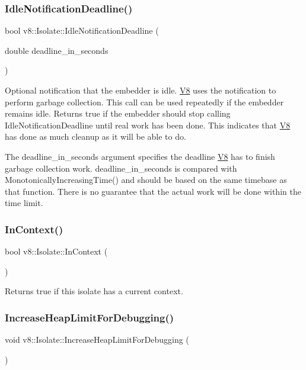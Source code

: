 \subsubsection{\texorpdfstring{Idle\+Notification\+Deadline()}{IdleNotificationDeadline()}}
{\footnotesize\ttfamily bool v8\+::\+Isolate\+::\+Idle\+Notification\+Deadline (\begin{DoxyParamCaption}\item[{double}]{deadline\+\_\+in\+\_\+seconds }\end{DoxyParamCaption})}

Optional notification that the embedder is idle. \mbox{\hyperlink{classv8_1_1V8}{V8}} uses the notification to perform garbage collection. This call can be used repeatedly if the embedder remains idle. Returns true if the embedder should stop calling Idle\+Notification\+Deadline until real work has been done. This indicates that \mbox{\hyperlink{classv8_1_1V8}{V8}} has done as much cleanup as it will be able to do.

The deadline\+\_\+in\+\_\+seconds argument specifies the deadline \mbox{\hyperlink{classv8_1_1V8}{V8}} has to finish garbage collection work. deadline\+\_\+in\+\_\+seconds is compared with Monotonically\+Increasing\+Time() and should be based on the same timebase as that function. There is no guarantee that the actual work will be done within the time limit. \mbox{\label{classv8_1_1Isolate_afb6bbd31a87d0999dbbe5402447690a9}} 
\subsubsection{\texorpdfstring{In\+Context()}{InContext()}}
{\footnotesize\ttfamily bool v8\+::\+Isolate\+::\+In\+Context (\begin{DoxyParamCaption}{ }\end{DoxyParamCaption})}

Returns true if this isolate has a current context. \mbox{\label{classv8_1_1Isolate_a72cccea72b0a24af320542bbd5919043}} 
\subsubsection{\texorpdfstring{Increase\+Heap\+Limit\+For\+Debugging()}{IncreaseHeapLimitForDebugging()}}
{\footnotesize\ttfamily void v8\+::\+Isolate\+::\+Increase\+Heap\+Limit\+For\+Debugging (\begin{DoxyParamCaption}{ }\end{DoxyParamCaption})}

